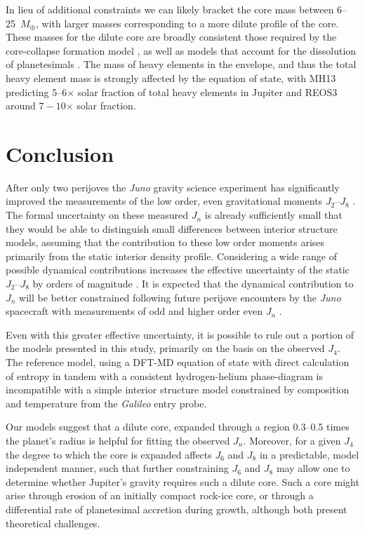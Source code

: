 In lieu of additional constraints we can likely bracket the core mass between
6--25~$M_\oplus$, with larger masses corresponding to a more dilute profile of
the core. These  masses for the dilute core are broadly consistent those
required by the core-collapse formation model \cite{Pollack1996}, as well as
models  that account for the dissolution of planetesimals \citep{lozovsky2017}.
The mass of heavy elements in the envelope, and thus the total heavy element
mass is strongly affected by the equation of state, with MH13 predicting
5--6$\times$ solar fraction of total heavy elements in Jupiter and REOS3 around 
$7-10$$\times$ solar fraction.


\section{Conclusion} \label{sec:conclusion}

After only two perijoves the \textit{Juno} gravity science experiment has
significantly improved the measurements of the low order, even gravitational
moments $J_2$--$J_8$ \citep{Folkner2017}. The formal uncertainty on these
measured $J_n$ is already sufficiently small that they would be able to
distinguish small differences between interior structure models, assuming that
the contribution to these low order moments arises primarily from the static
interior density profile. Considering a wide range of possible dynamical
contributions increases the effective uncertainty of the static $J_2$--$J_8$ by
orders of magnitude \citep{Kaspi2017}. It is expected that the dynamical
contribution to $J_n$ will be better constrained following future perijove
encounters by the \textit{Juno} spacecraft with measurements of odd and higher
order even $J_n$ \citep{kaspi2013}. 

Even with this greater effective uncertainty, it is possible to rule out
a portion of the models presented in this study, primarily on the basis on the
observed $J_4$. The reference model, using a DFT-MD equation of state with
direct calculation of entropy in tandem with a consistent hydrogen-helium
phase-diagram is incompatible with a simple interior structure  model
constrained by composition and temperature from the \textit{Galileo} entry
probe. 

Our models suggest that a dilute core, expanded through a region 0.3--0.5
times the planet's radius is helpful for fitting the observed $J_n$.  Moreover,
for a given $J_4$ the degree to which the core is expanded affects $J_6$ and
$J_8$ in a predictable, model independent manner, such that further
constraining $J_6$ and $J_8$ may allow one to determine whether Jupiter's
gravity requires such a dilute core. Such a core might arise through erosion
of an initially compact rock-ice core, or through a differential rate of
planetesimal accretion during growth, although both present theoretical
challenges.

